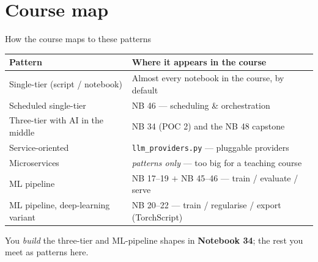 \documentclass[aspectratio=169,11pt]{beamer}
\begin{document}
\section{Course map}
\begin{frame}{How the course maps to these patterns}
  \small
  \begin{center}
  \begin{tabular}{ll}
    \toprule
    \textbf{Pattern} & \textbf{Where it appears in the course} \\
    \midrule
    Single-tier (script / notebook) & Almost every notebook in the course, by default \\
    Scheduled single-tier           & NB 46 --- scheduling \& orchestration \\
    Three-tier with AI in the middle& NB 34 (POC 2) and the NB 48 capstone \\
    Service-oriented                & \texttt{llm\_providers.py} --- pluggable providers \\
    Microservices                   & \emph{patterns only} --- too big for a teaching course \\
    ML pipeline                     & NB 17--19 $+$ NB 45--46 --- train / evaluate / serve \\
    ML pipeline, deep-learning variant & NB 20--22 --- train / regularise / export (TorchScript) \\
    \bottomrule
  \end{tabular}
  \end{center}
  \vspace{4pt}
  {\footnotesize You \emph{build} the three-tier and ML-pipeline shapes in \textbf{Notebook 34}; the rest you meet as patterns here.}
\end{frame}
\end{document}

